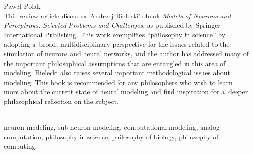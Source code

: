 \begin{newrevengenv}{Paweł Polak}
\vspace{15mm}%
{}\\
{This review article discusses Andrzej Bielecki's book \textit{Models of Neurons and Perceptrons: Selected Problems and Challenges}, as published by Springer International Publishing. This work exemplifies ``philosophy in science'' by adopting a~broad, multidisciplinary perspective for the issues related to the simulation of neurons and neural networks, and the author has addressed many of the important philosophical assumptions that are entangled in this area of modeling. Bielecki also raises several important methodological issues about modeling. This book is recommended for any philosophers who wish to learn more about the current state of neural modeling and find inspiration for a~deeper philosophical reflection on the subject.}\par%
\vspace{2mm}%
{}\\
{neuron modeling, sub-neuron modeling, computational modeling, analog computation, philosophy in science, philosophy of biology, philosophy of computing.}%



\end{newrevengenv}